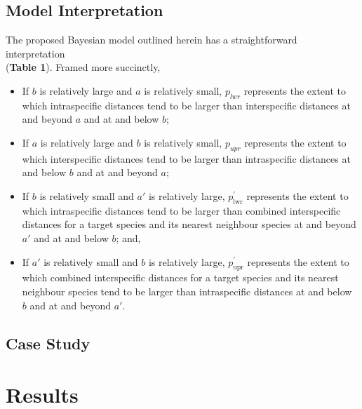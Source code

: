 \documentclass[12pt]{article}
\begin{document}
\subsection{Model Interpretation}

The proposed Bayesian model outlined herein has a straightforward interpretation \\ (\textbf{Table 1}). Framed more succinctly, 

\begin{itemize}

\item If $b$ is relatively large and $a$ is relatively small, $p_{lwr}$ represents the extent to which intraspecific distances tend to be larger than interspecific distances at and beyond $a$ and at and below $b$;

\vspace{1mm}

\item If $a$ is relatively large and $b$ is relatively small, $p_{upr}$ represents the extent to which interspecific distances tend to be larger than intraspecific distances at and below $b$ and at and beyond $a$;

\vspace{1mm}

\item If $b$ is relatively small and $a'$ is relatively large, $p^{'}_\mathrm{lwr}$ represents the extent to which intraspecific distances tend to be larger than combined interspecific distances for a target species and its nearest neighbour species at and beyond $a'$ and at and below $b$; and,

\vspace{1mm}

\item If $a'$ is relatively small and $b$ is relatively large, $p^{'}_\mathrm{upr}$ represents the extent to which combined interspecific distances for a target species and its nearest neighbour species tend to be larger than intraspecific distances at and below $b$ and at and beyond $a'$.


\end{itemize}

\subsection{Case Study}

\section{Results}
\end{document}
